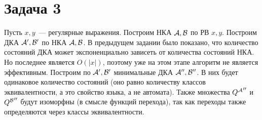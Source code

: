 \documentclass[a4paper]{article}
\def\A{{\cal A}}
\def\B{{\cal B}}
\begin{document}
\section*{Задача 3}
Пусть $x,y$~--- регулярные выражения. Построим НКА $\A,\B$ по РВ $x,y$.
Построим ДКА $\A',\B'$ по НКА $\A,\B$. В предыдущем задании было показано, что количество состояний ДКА может экспоненциально зависеть от количества состояний НКА. Но последнее является $O(|x|)$, поэтому уже на этом этапе алгоритм не является эффективным.\newline
Построим по $\A',\B'$ минимальные ДКА $\A'',\B''$. В них будет одинаковое количество состояний (оно равно количеству классов эквивалентности, а это свойство языка, а не автомата). Также множества ${Q^{\A}}''$ и ${Q^{\B}}''$ будут изоморфны (в смысле функций перехода), так как переходы также определяются через классы эквивалентности.
\end{document}
